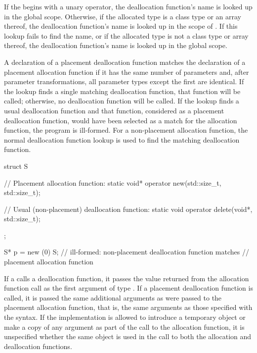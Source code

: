 \pnum
If the  begins with a unary \tcode{::}
operator, the deallocation function's name is looked up in the global
scope. Otherwise, if the allocated type is a class type  or an
array thereof, the deallocation function's name is looked up in the
scope of . If this lookup fails to find the name, or if the
allocated type is not a class type or array thereof, the deallocation
function's name is looked up in the global scope.

\pnum
A declaration of a placement deallocation function matches the
declaration of a placement allocation function if it has the same number
of parameters and, after parameter transformations, all
parameter types except the first are identical. If
the lookup finds a single matching deallocation function, that function
will be called; otherwise, no deallocation function will be called. If
the lookup finds a usual deallocation
function
and that function,
considered as a placement deallocation function, would have been
selected as a match for the allocation function, the program is
ill-formed. For a non-placement allocation function, the normal deallocation
function lookup is used to find the matching deallocation
function.
\begin{example}
\begin{codeblock}
struct S {
  // Placement allocation function:
  static void* operator new(std::size_t, std::size_t);

  // Usual (non-placement) deallocation function:
  static void operator delete(void*, std::size_t);
};

S* p = new (0) S;   // ill-formed: non-placement deallocation function matches
                    // placement allocation function
\end{codeblock}

\end{example}

\pnum
If a  calls a deallocation function, it passes
the value returned from the allocation function call as the first
argument of type . If a placement deallocation function is
called, it is passed the same additional arguments as were passed to the
placement allocation function, that is, the same arguments as those
specified with the  syntax.
If the implementation is allowed
to introduce a temporary object or make a copy of any argument
as part of the call to the allocation function,
it is unspecified whether the same object is used in the call
to both the allocation and deallocation functions.

